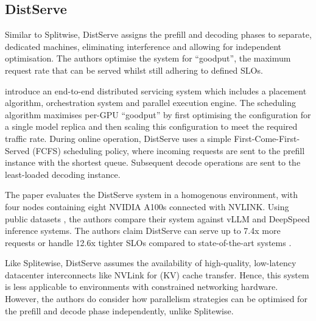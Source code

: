 \subsection{DistServe}
Similar to Splitwise, DistServe \autocite{zhongDistServeDisaggregatingPrefill2024} assigns the prefill and decoding phases to separate, dedicated machines, eliminating interference and allowing for independent optimisation.
The authors optimise the system for ``goodput'', the maximum request rate that can be served whilst still adhering to defined SLOs.

\textcite{zhongDistServeDisaggregatingPrefill2024} introduce an end-to-end distributed servicing system which includes a placement algorithm, orchestration system and parallel execution engine.
The scheduling algorithm maximises per-GPU ``goodput'' by first optimising the configuration for a single model replica and then scaling this configuration to meet the required traffic rate.
During online operation, DistServe uses a simple First-Come-First-Served (FCFS) scheduling policy, where incoming requests are sent to the prefill instance with the shortest queue.
Subsequent decode operations are sent to the least-loaded decoding instance.


The paper evaluates the DistServe system in a homogenous environment, with four nodes containing eight NVIDIA A100s connected with NVLINK.
Using public datasets \autocite{ShareGPT} \autocite{chenEvaluatingLargeLanguage2021} \autocite{baiLongBenchBilingualMultitask2024}, the authors compare their system against vLLM \autocite{kwonEfficientMemoryManagement2023} and DeepSpeed \autocite{DeepspeedaiDeepSpeed2025} inference systems.
The authors claim DistServe can serve up to 7.4x more requests or handle 12.6x tighter SLOs compared to state-of-the-art systems \textcite{zhongDistServeDisaggregatingPrefill2024}.




Like Splitewise, DistServe assumes the availability of high-quality, low-latency datacenter interconnects like NVLink for (KV) cache transfer.
Hence, this system is less applicable to environments with constrained networking hardware.
However, the authors do consider how parallelism strategies can be optimised for the prefill and decode phase independently, unlike Splitewise.

